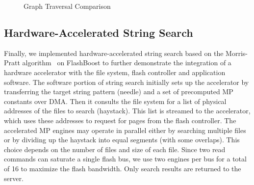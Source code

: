 
\begin{figure}[ht!]
	\centering

		\hfill
		\hfill
		\hfill
	\caption{Graph Traversal Comparison}
	\label{fig:graph_accel}
\end{figure}

\subsection{Hardware-Accelerated String Search}

Finally, we implemented hardware-accelerated string search based on the
Morris-Pratt algorithm~\cite{?} on FlashBoost to further demonstrate the
integration of a hardware accelerator with the file system, flash controller
and application software.  The software portion of string search initially sets
up the accelerator by transferring the target string pattern (needle) and a set
of precomputed MP constants over DMA. Then it consults the file system for a
list of physical addresses of the files to search (haystack).  This list is
streamed to the accelerator, which uses these addresses to request for pages
from the flash controller.  The accelerated MP engines may operate in parallel
either by searching multiple files or by dividing up the haystack into equal
segments (with some overlaps). This choice depends on the number of files and
size of each file. Since two read commands can saturate a single flash bus, we
use two engines per bus for a total of 16 to maximize the flash bandwidth. Only
search results are returned to the server. 
